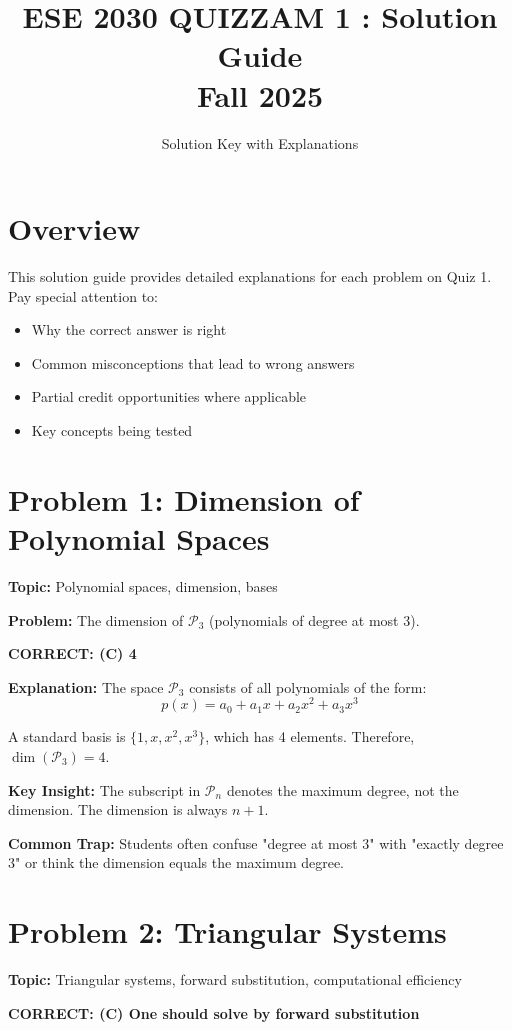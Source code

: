 \documentclass[12pt]{amsart}
\title{ESE 2030 QUIZZAM 1 : Solution Guide\\Fall 2025}
\author{Solution Key with Explanations}
\newcommand{\correct}[1]{{\color{blue}\textbf{CORRECT: #1}}}
\newcommand{\hint}{\textbf{Key Insight: }}
\newcommand{\trap}{\textbf{Common Trap: }}
\begin{document}
\maketitle

\section*{Overview}
This solution guide provides detailed explanations for each problem on Quiz 1. Pay special attention to:
\begin{itemize}
\item Why the correct answer is right
\item Common misconceptions that lead to wrong answers
\item Partial credit opportunities where applicable
\item Key concepts being tested
\end{itemize}

\hrulefill

\section*{Problem 1: Dimension of Polynomial Spaces}
\textbf{Topic:} Polynomial spaces, dimension, bases

\textbf{Problem:} The dimension of $\mathcal{P}_3$ (polynomials of degree at most 3).

\correct{(C) 4}

\textbf{Explanation:} The space $\mathcal{P}_3$ consists of all polynomials of the form:
$$p(x) = a_0 + a_1x + a_2x^2 + a_3x^3$$

A standard basis is $\{1, x, x^2, x^3\}$, which has 4 elements. Therefore, $\dim(\mathcal{P}_3) = 4$.

\hint The subscript in $\mathcal{P}_n$ denotes the maximum degree, not the dimension. The dimension is always $n+1$.

\trap Students often confuse "degree at most 3" with "exactly degree 3" or think the dimension equals the maximum degree.

\hrulefill

\section*{Problem 2: Triangular Systems}
\textbf{Topic:} Triangular systems, forward substitution, computational efficiency

\correct{(C) One should solve by forward substitution}
\end{document}
